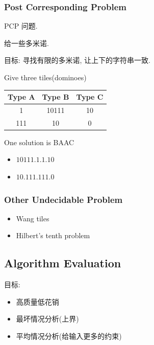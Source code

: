 \subsubsection{Post Corresponding Problem}
PCP 问题. 

给一些多米诺.

目标: 寻找有限的多米诺, 让上下的字符串一致.

\begin{example}
    Give three tiles(dominoes)
    \begin{table}[H]
        \centering
        \begin{tabular}[c]{ccc}\toprule
            Type A & Type B & Type C \\ \midrule
            1 & 10111& 10\\
            111& 10 & 0\\
            \bottomrule
        \end{tabular}
    \end{table}
    
    One solution is BAAC
    \begin{itemize}
        \item $10111.1.1.10$
        \item $10.111.111.0$
    \end{itemize}
\end{example}



\subsubsection{Other Undecidable Problem}
\begin{itemize}
    \item Wang tiles
    \item Hilbert's tenth problem
\end{itemize}

\subsection{Algorithm Evaluation}
目标:
\begin{itemize}
    \item 高质量低花销
    \item 最坏情况分析(上界)
    \item 平均情况分析(给输入更多的约束)
\end{itemize}

